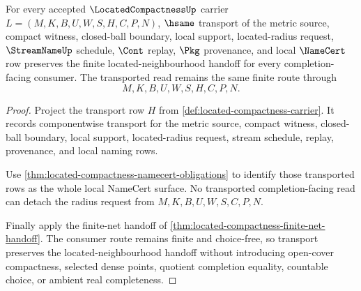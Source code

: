 \begin{theorem}
\label{thm:located-compactness-radius-stability}
For every accepted $\LocatedCompactnessUp$ carrier $L=(M,K,B,U,W,S,H,C,P,N)$, $\hsame$ transport of the metric source, compact witness, closed-ball boundary, local support, located-radius request, $\StreamNameUp$ schedule, $\Cont$ replay, $\Pkg$ provenance, and local $\NameCert$ row preserves the finite located-neighbourhood handoff for every completion-facing consumer. The transported read remains the same finite route through
$$
M,K,B,U,W,S,H,C,P,N .
$$
\end{theorem}
\begin{proof}
Project the transport row $H$ from \autoref{def:located-compactness-carrier}. It records componentwise transport for the metric source, compact witness, closed-ball boundary, local support, located-radius request, stream schedule, replay, provenance, and local naming rows.

Use \autoref{thm:located-compactness-namecert-obligations} to identify those transported rows as the whole local NameCert surface. No transported completion-facing read can detach the radius request from $M,K,B,U,W,S,C,P,N$.

Finally apply the finite-net handoff of \autoref{thm:located-compactness-finite-net-handoff}. The consumer route remains finite and choice-free, so transport preserves the located-neighbourhood handoff without introducing open-cover compactness, selected dense points, quotient completion equality, countable choice, or ambient real completeness.
\end{proof}



